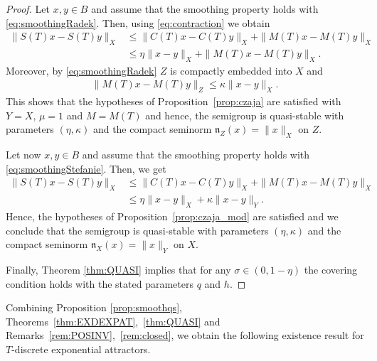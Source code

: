 \documentclass[a4paper,12pt,reqno]{amsart}
\theoremstyle{plain}
\theoremstyle{definition}
\numberwithin{equation}{section}
\renewcommand{\leq}{\leqslant}
\begin{document}
\begin{proof}
Let $x,y\in B$ and assume that the smoothing property holds with \eqref{eq:smoothingRadek}. Then, using \eqref{eq:contraction} we obtain 
\begin{align*}
\|S(T)x-S(T)y\|_X&\leq \|C(T)x-C(T)y\|_X+\|M(T)x-M(T)y\|_X\\
&\leq \eta\|x-y\|_X+\|M(T)x-M(T)y\|_X.
\end{align*}
Moreover, by \eqref{eq:smoothingRadek} $Z$ is compactly embedded into $X$ and
\begin{align*}
\|M(T)x-M(T)y\|_Z\leq 
\kappa\|x-y\|_X.
\end{align*} 
This shows that the hypotheses of Proposition~\ref{prop:czaja} are satisfied with $Y=X$, $\mu=1$ and $M=M(T)$ and hence, the semigroup is quasi-stable with parameters $(\eta,\kappa)$ and the compact seminorm $\mathfrak{n}_{Z}(x)=\|x\|_X$ on $Z$. 

Let now $x,y\in B$ and assume that the smoothing property holds with \eqref{eq:smoothingStefanie}. Then, we get
\begin{align*}
\|S(T)x-S(T)y\|_X&\leq \|C(T)x-C(T)y\|_X+\|M(T)x-M(T)y\|_X\\
&\leq \eta\|x-y\|_X+\kappa\|x-y\|_Y.
\end{align*}
Hence, the hypotheses of Proposition~\ref{prop:czaja_mod} are satisfied and we conclude that 
the semigroup is quasi-stable with parameters $(\eta,\kappa)$ and the compact seminorm $\mathfrak{n}_{X}(x)=\|x\|_Y$ on $X$.
 
Finally, Theorem \ref{thm:QUASI} implies that for any $\sigma\in (0,1-\eta)$ the covering condition holds with the stated parameters $q$ and $h$.
\end{proof}

Combining Proposition \ref{prop:smoothqs}, Theorems~\ref{thm:EXDEXPAT},~\ref{thm:QUASI} and Remarks~\ref{rem:POSINV},~\ref{rem:closed}, we obtain the following existence result for $T$-discrete exponential attractors. 
\end{document}
